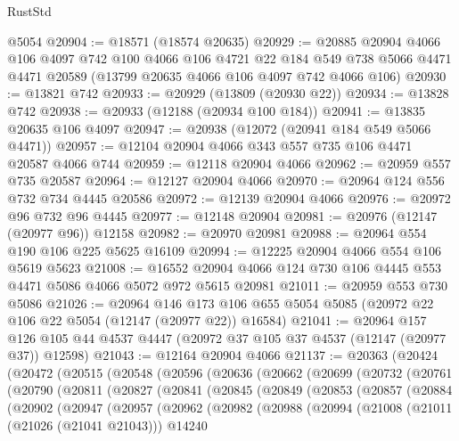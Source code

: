 \begin{lexlean}{RustStd}
\begin{coremodule}
    @5054
@20904 := @18571 (@18574 @20635)
@20929 := @20885
    @20904
    @4066
    @106
    @4097
    @742
    @100
    @4066
    @106
    @4721
    @22
    @184
    @549
    @738
    @5066
    @4471
    @4471
    @20589
    (@13799 @20635 @4066 @106 @4097 @742 @4066 @106)
@20930 := @13821 @742
@20933 := @20929 (@13809 (@20930 @22))
@20934 := @13828 @742
@20938 := @20933 (@12188 (@20934 @100 @184))
@20941 := @13835 @20635 @106 @4097
@20947 := @20938 (@12072 (@20941 @184 @549 @5066 @4471))
@20957 := @12104 @20904 @4066 @343 @557 @735 @106 @4471 @20587 @4066 @744
@20959 := @12118 @20904 @4066
@20962 := @20959 @557 @735 @20587
@20964 := @12127 @20904 @4066
@20970 := @20964 @124 @556 @732 @734 @4445 @20586
@20972 := @12139 @20904 @4066
@20976 := @20972 @96 @732 @96 @4445
@20977 := @12148 @20904
@20981 := @20976 (@12147 (@20977 @96)) @12158
@20982 := @20970 @20981
@20988 := @20964 @554 @190 @106 @225 @5625 @16109
@20994 := @12225 @20904 @4066 @554 @106 @5619 @5623
@21008 := @16552 @20904 @4066 @124 @730 @106 @4445 @553 @4471 @5086 @4066 @5072 @972 @5615 @20981
@21011 := @20959 @553 @730 @5086
@21026 := @20964
    @146
    @173
    @106
    @655
    @5054
    @5085
    (@20972 @22 @106 @22 @5054 (@12147 (@20977 @22)) @16584)
@21041 := @20964
    @157
    @126
    @105
    @44
    @4537
    @4447
    (@20972 @37 @105 @37 @4537 (@12147 (@20977 @37)) @12598)
@21043 := @12164 @20904 @4066
@21137 := @20363
    (@20424
      (@20472
        (@20515
          (@20548
            (@20596
              (@20636
                (@20662
                  (@20699
                    (@20732
                      (@20761
                        (@20790
                          (@20811
                            (@20827
                              (@20841
                                (@20845
                                  (@20849
                                    (@20853
                                      (@20857
                                        (@20884
                                          (@20902
                                            (@20947
                                              (@20957
                                                (@20962
                                                  (@20982
                                                    (@20988
                                                      (@20994
                                                        (@21008
                                                          (@21011 (@21026 (@21041 @21043)))
                                                          @14240

\end{coremodule}
\end{lexlean}
